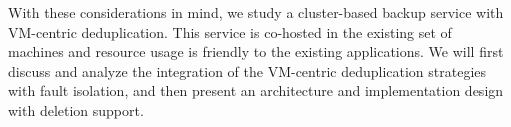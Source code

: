 

%


With these considerations in mind, we study a cluster-based backup service 
with VM-centric deduplication. This service is co-hosted   in the existing set of machines and resource usage is friendly
to the existing applications.  
We will first discuss and analyze the integration of the VM-centric deduplication strategies with fault isolation, and then present
an architecture and implementation design with deletion support.

